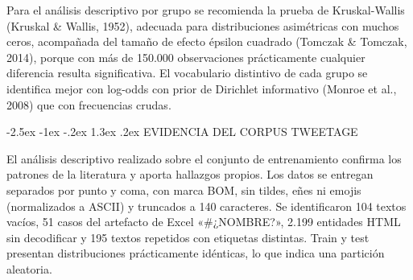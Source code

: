\documentclass[10pt,twocolumn]{article}
\makeatletter
\renewcommand{\section}{\@startsection{section}{1}{\z@}%
  {-2.5ex \@plus -1ex \@minus -.2ex}%
  {1.3ex \@plus .2ex}%
  {\normalfont\large\bfseries\centering}}
\makeatother
\begin{document}
Para el análisis descriptivo por grupo se recomienda la prueba de Kruskal-Wallis (Kruskal \& Wallis, 1952), adecuada para distribuciones asimétricas con muchos ceros, acompañada del tamaño de efecto épsilon cuadrado (Tomczak \& Tomczak, 2014), porque con más de 150.000 observaciones prácticamente cualquier diferencia resulta significativa. El vocabulario distintivo de cada grupo se identifica mejor con log-odds con prior de Dirichlet informativo (Monroe et al., 2008) que con frecuencias crudas.


\section{EVIDENCIA DEL CORPUS TWEETAGE}\label{sec:8}

El análisis descriptivo realizado sobre el conjunto de entrenamiento confirma los patrones de la literatura y aporta hallazgos propios. Los datos se entregan separados por punto y coma, con marca BOM, sin tildes, eñes ni emojis (normalizados a ASCII) y truncados a 140 caracteres. Se identificaron 104 textos vacíos, 51 casos del artefacto de Excel «\#¿NOMBRE?», 2.199 entidades HTML sin decodificar y 195 textos repetidos con etiquetas distintas. Train y test presentan distribuciones prácticamente idénticas, lo que indica una partición aleatoria.
\end{document}
